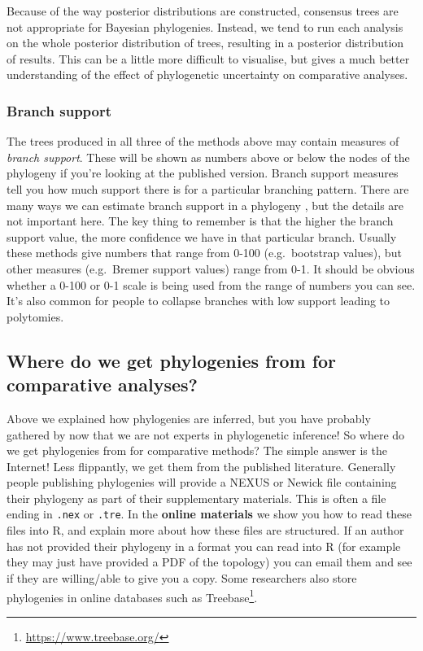 \documentclass[]{book}
\renewcommand{\href}[2]{#2\footnote{\url{#1}}}
\begin{document}
Because of the way posterior distributions are constructed, consensus
trees are not appropriate for Bayesian phylogenies. Instead, we tend to
run each analysis on the whole posterior distribution of trees,
resulting in a posterior distribution of results. This can be a little
more difficult to visualise, but gives a much better understanding of
the effect of phylogenetic uncertainty on comparative analyses.

\subsubsection{Branch support}\label{branch-support}

The trees produced in all three of the methods above may contain
measures of \emph{branch support}. These will be shown as numbers above
or below the nodes of the phylogeny if you're looking at the published
version. Branch support measures tell you how much support there is for
a particular branching pattern. There are many ways we can estimate
branch support in a phylogeny \citep{felsenstein2004inferring}, but the
details are not important here. The key thing to remember is that the
higher the branch support value, the more confidence we have in that
particular branch. Usually these methods give numbers that range from
0-100 (e.g.~bootstrap values), but other measures (e.g.~Bremer support
values) range from 0-1. It should be obvious whether a 0-100 or 0-1
scale is being used from the range of numbers you can see. It's also
common for people to collapse branches with low support leading to
polytomies.

\subsection{Where do we get phylogenies from for comparative
analyses?}\label{where-do-we-get-phylogenies-from-for-comparative-analyses}

Above we explained how phylogenies are inferred, but you have probably
gathered by now that we are not experts in phylogenetic inference! So
where do we get phylogenies from for comparative methods? The simple
answer is the Internet! Less flippantly, we get them from the published
literature. Generally people publishing phylogenies will provide a NEXUS
or Newick file containing their phylogeny as part of their supplementary
materials. This is often a file ending in \texttt{.nex} or
\texttt{.tre}. In the \textbf{online materials} we show you how to read
these files into R, and explain more about how these files are
structured. If an author has not provided their phylogeny in a format
you can read into R (for example they may just have provided a PDF of
the topology) you can email them and see if they are willing/able to
give you a copy. Some researchers also store phylogenies in online
databases such as \href{https://www.treebase.org/}{Treebase}.
\end{document}
